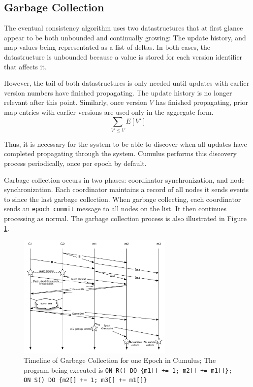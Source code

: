 \documentclass{vldb}
\begin{document}
\subsection{Garbage Collection}
The eventual consistency algorithm uses two datastructures that at first glance appear to be both unbounded and continually growing: The update history, and map values being representated as a list of deltas.  In both cases, the datastructure is unbounded because a value is stored for each version identifier that affects it. 

However, the tail of both datastructures is only needed until updates with earlier version numbers have finished propagating.  The update history is no longer relevant after this point.  Similarly, once version $V$ has finished propagating, prior map entries with earlier versions are used only in the aggregate form.
$$\sum_{V' \leq V} E[V']$$

Thus, it is necessary for the system to be able to discover when all updates have completed propagating through the system.  Cumulus performs this discovery process periodically, once per epoch by default.  


Garbage collection occurs in two phases: coordinator synchronization, and node synchronization.  Each coordinator maintains a record of all nodes it sends events to since the last garbage collection.  When garbage collecting, each coordinator sends an \texttt{epoch commit} message to all nodes on the list.  It then continues processing as normal.  The garbage collection process is also illustrated in Figure \ref{fig:GCflowchart}.

\begin{figure}
\begin{center}
\includegraphics[width=3in]{graphics/GCflowchart}
\caption{Timeline of Garbage Collection for one Epoch in Cumulus; The program being executed is \texttt{ON R() DO \{m1[] += 1; m2[] += m1[]\}; ON S() DO \{m2[] += 1; m3[] += m1[]\}} }
\label{fig:GCflowchart}
\end{center}

\end{figure}
\end{document}
